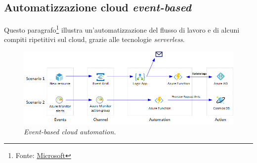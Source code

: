 \documentclass[a4paper]{article}
\begin{document}
	\subsection{Automatizzazione cloud \emph{event-based}}
	
	Questo paragrafo\footnote{Fonte: \href{https://learn.microsoft.com/en-us/azure/architecture/reference-architectures/serverless/cloud-automation}{Microsoft}} illustra un'automatizzazione del flusso di lavoro e di alcuni compiti ripetitivi sul cloud, grazie alle tecnologie \emph{serverless}.
	\begin{figure}[!htp]
		\centering
		\includegraphics[width=\textwidth]{img/cloud-automation.png}
		\caption{\emph{Event-based cloud automation.}}
	\end{figure}
	
\end{document}

